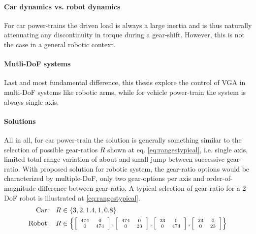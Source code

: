 \paragraph{Car dynamics vs. robot dynamics }
%
For car power-trains the driven load is always a large inertia and is thus naturally attenuating any discontinuity in torque during a gear-shift. However, this is not the case in a general robotic context. 

\paragraph{Mutli-DoF systems}
%
Last and most fundamental difference, this thesis explore the control of VGA in multi-DoF systems like robotic arms, while for vehicle power-train the system is always single-axis.

\paragraph{Solutions}
%
All in all, for car power-train the solution is generally something similar to the selection of possible gear-ratios $R$ shown at eq. \eqref{eq:rangestypical}, i.e. single axis, limited total range variation of about and small jump between successive gear-ratio. With proposed solution for robotic system, the gear-ratio options would be characterized by multiple-DoF, only two gear-options per axis and order-of-magnitude difference between gear-ratio. A typical selection of gear-ratio for a 2 DoF robot is illustrated at \eqref{eq:rangestypical}. %
%
\begin{align}
  \text{Car:}& \quad R \in \{ 3 , 2 , 1.4 , 1 , 0.8 \} 
	\\
	\text{Robot:}& \quad R \in 
	\scriptsize
	\left \{
	\left[
	\begin{array}{c c}
	474 & 0 \\ 0 & 474
	\end{array} 
	\right]
	,
	\left[
	\begin{array}{c c}
	474 & 0 \\ 0 & 23
	\end{array} 
	\right]
	,
	\left[
	\begin{array}{c c}
	23 & 0 \\ 0 & 474
	\end{array} 
	\right]
	,
	\left[
	\begin{array}{c c}
	23 & 0 \\ 0 & 23
	\end{array} 
	\right]
	\right \}
 \label{eq:rangestypical}
\end{align}



